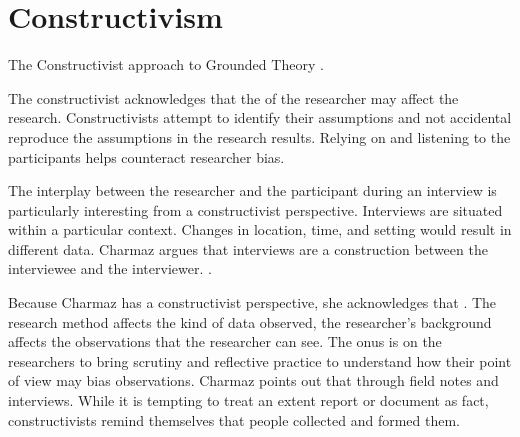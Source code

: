 

\section{Constructivism}
\label{Constructivism}
The Constructivist approach to Grounded Theory  \cite{StolGroundedTheory}. 

The constructivist acknowledges that the  of the researcher may affect the research. Constructivists attempt to identify their assumptions and not accidental reproduce the assumptions in the research results. Relying on and listening to the participants helps counteract researcher bias.

The interplay between the researcher and the participant during an interview is particularly interesting from a constructivist perspective. Interviews are situated within a particular context. Changes in location, time, and setting would result in different data.  Charmaz argues that interviews are a construction between the interviewee and the interviewer.  \cite{Charmaz}.

Because Charmaz has a constructivist perspective, she acknowledges that  \cite{Charmaz}. The research method affects the kind of data observed, the researcher's background affects the observations that the researcher can see. The onus is on the researchers to bring scrutiny and reflective practice to understand how their point of view may bias observations. Charmaz points out that  through field notes and interviews. While it is tempting to treat an extent report or document as fact, constructivists remind themselves that people collected and formed them.

